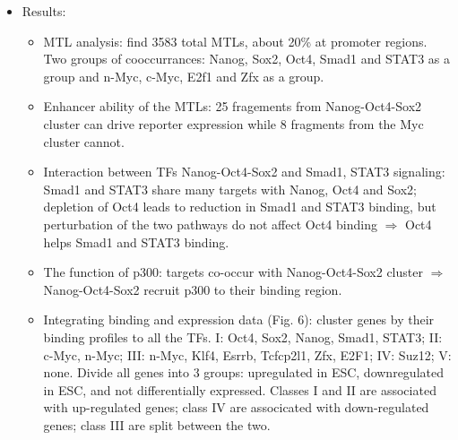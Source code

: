 \documentclass{report}
\begin{document}
\begin{itemize}
	\item Results:
	\begin{itemize}
		\item MTL analysis: find 3583 total MTLs, about 20\% at promoter regions. Two groups of cooccurrances: Nanog, Sox2, Oct4, Smad1 and STAT3 as a group and n-Myc, c-Myc, E2f1 and Zfx as a group. 
		\item Enhancer ability of the MTLs: 25 fragements from Nanog-Oct4-Sox2 cluster can drive reporter expression while 8 fragments from the Myc cluster cannot. 
		\item Interaction between TFs Nanog-Oct4-Sox2 and Smad1, STAT3 signaling: Smad1 and STAT3 share many targets with Nanog, Oct4 and Sox2; depletion of Oct4 leads to reduction in Smad1 and STAT3 binding, but perturbation of the two pathways do not affect Oct4 binding $\Rightarrow$ Oct4 helps Smad1 and STAT3 binding. 
		\item The function of p300: targets co-occur with Nanog-Oct4-Sox2 cluster $\Rightarrow$ Nanog-Oct4-Sox2 recruit p300 to their binding region. 
		\item Integrating binding and expression data (Fig. 6): cluster genes by their binding profiles to all the TFs. I: Oct4, Sox2, Nanog, Smad1, STAT3; II: c-Myc, n-Myc; III: n-Myc, Klf4, Esrrb, Tcfcp2l1, Zfx, E2F1; IV: Suz12; V: none. Divide all genes into 3 groups: upregulated in ESC, downregulated in ESC, and not differentially expressed. Classes I and II are associated with up-regulated genes; class IV are associcated with down-regulated genes; class III are split between the two. 
	\end{itemize}
\end{itemize}
	
\end{document}
